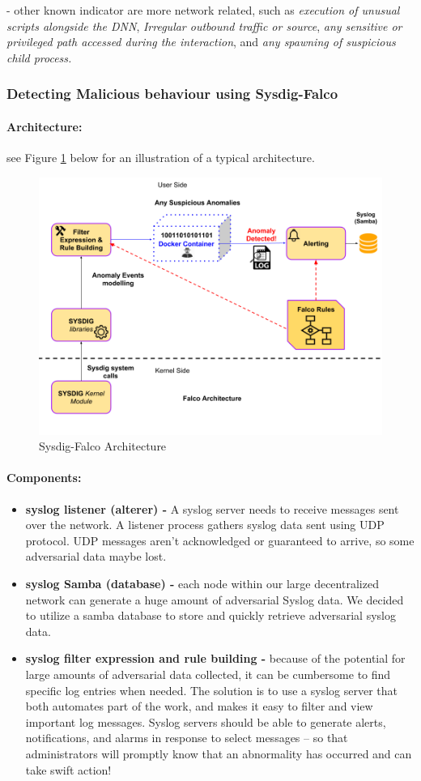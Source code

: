 \documentclass[grad,lot,lof,11pt,oneside,onehalfspace]{RUthesis}
\begin{document}
\begin{itemize}
	
	- other known indicator are more network related, such as \textit{execution of unusual scripts alongside the DNN}, \textit{Irregular outbound traffic or source}, \textit{any sensitive or privileged path accessed during the interaction}, and \textit{any spawning of suspicious child process.}
\end{itemize}
\subsubsection{Detecting Malicious behaviour using Sysdig-Falco}
\paragraph{Architecture:} see Figure \ref{fig:FalcoArch} below for an illustration of a typical architecture.
\begin{figure}[h]
	\centering
	\includegraphics[width=0.7\linewidth]{"Images/Chapter 4/FalcoArch"}
	\caption{Sysdig-Falco Architecture}
	\label{fig:FalcoArch}
\end{figure} 
\paragraph{Components:}
\begin{itemize}
	\item \textbf{syslog listener (alterer) -}
	A syslog server needs to receive messages sent over the network. A listener process gathers syslog data sent using UDP protocol. UDP messages aren’t acknowledged or guaranteed to arrive, so some adversarial data maybe lost.
	\item \textbf{syslog Samba (database) -}
	each node within our large decentralized network can generate a huge amount of adversarial Syslog data. We decided to utilize a samba database to store and quickly retrieve adversarial syslog data.
	\item \textbf{syslog filter expression and rule building -} because of the potential for large amounts of adversarial data collected, it can be cumbersome to find specific log entries when needed. The solution is to use a syslog server that both automates part of the work, and makes it easy to filter and view important log messages. Syslog servers should be able to generate alerts, notifications, and alarms in response to select messages – so that administrators will promptly know that an abnormality has occurred and can take swift action!
\end{itemize}
\end{document}
